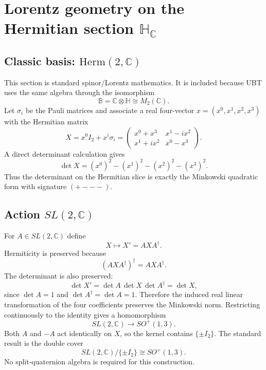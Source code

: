 
\chapter{Lorentz geometry on the Hermitian section \(\mathbb H_{\mathbb C}\)}
\label{ch:lorentz-hc}

\section{Classic basis: \(\mathrm{Herm}(2,\mathbb C)\)}
This section is standard spinor/Lorentz mathematics.  It is included because
UBT uses the same algebra through the isomorphism
\[
 \mathbb B=\mathbb C\otimes\mathbb H\cong M_2(\mathbb C).
\]
Let $\sigma_i$ be the Pauli matrices and associate a real four-vector
$x=(x^0,x^1,x^2,x^3)$ with the Hermitian matrix
\[
 X=x^0 I_2+x^i\sigma_i
 =\begin{pmatrix}
 x^0+x^3 & x^1-i x^2\\
 x^1+i x^2 & x^0-x^3
 \end{pmatrix}.
\]
A direct determinant calculation gives
\[
 \boxed{\det X=(x^0)^2-(x^1)^2-(x^2)^2-(x^3)^2.}
\]
Thus the determinant on the Hermitian slice is exactly the Minkowski quadratic
form with signature $(+---)$.

\section{Action \(SL(2,\mathbb C)\)}
For $A\in SL(2,\mathbb C)$ define
\[
 X\longmapsto X'=A X A^\dagger .
\]
Hermiticity is preserved because
\[
 (A X A^\dagger)^\dagger=A X A^\dagger.
\]
The determinant is also preserved:
\[
 \det X'=\det A\,\det X\,\det A^\dagger
 =\det X,
\]
since $\det A=1$ and $\det A^\dagger=\overline{\det A}=1$.
Therefore the induced real linear transformation of the four coefficients
preserves the Minkowski norm.  Restricting continuously to the identity gives a
homomorphism
\[
 SL(2,\mathbb C)\longrightarrow SO^+(1,3).
\]
Both $A$ and $-A$ act identically on $X$, so the kernel contains
$\{\pm I_2\}$.  The standard result is the double cover
\[
 \boxed{SL(2,\mathbb C)/\{\pm I_2\}\cong SO^+(1,3).}
\]
No split-quaternion algebra is required for this construction.

